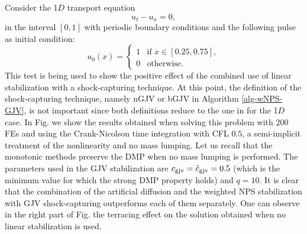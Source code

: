 Consider the 1$D$ transport equation 
\begin{equation}
\label{eq-eqtr}
u_t-u_x=0,
\end{equation}
in the interval $[0,1]$ with periodic boundary conditions and the following pulse as initial condition:
\begin{equation}\label{eq-trinc}
u_0(x) = \left\{
\begin{array}{ll}
1 & \textrm{if } x\in[0.25,0.75],\\
0 & \textrm{otherwise}.
\end{array}\right.
\end{equation}
This test is being used to show the positive effect of the combined use of linear stabilization with a shock-capturing technique. At this point, the definition of the shock-capturing technique, namely nGJV or bGJV in Algorithm \ref{alg-wNPS-GJV}, is not important since both definitions reduce to the one in \cite{burman_nonlinear_2007} for the 1$D$ case. In Fig.  we show the results obtained when solving this problem with $200$ FEs and using the Crank-Nicolson time integration  with CFL $0.5$, a semi-implicit treatment of the nonlinearity and no mass lumping. Let us recall that the monotonic methods preserve the DMP when no mass lumping is performed. The parameters used in the GJV stabilization are $c_{\rm gjv} = \tilde c_{\rm gjv} =0.5$ (which is the minimum value for which the strong DMP property holds) and $q=10$. It is clear that the combination of the artificial diffusion and the weighted NPS stabilization with GJV shock-capturing outperforms each of them separately. One can observe in the right part of Fig.  the terracing effect on the solution obtained when no linear stabilization is used.
